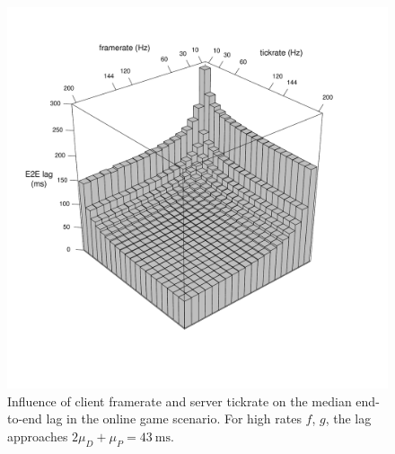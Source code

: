 \begin{figure}[!t]
	\centering
	\vspace{-6mm}
	\includegraphics[width=1.0\columnwidth]{../../../simulation/visualization/e2e-lag-3dbars.pdf}
	\vspace{-15mm}
	\caption{Influence of client framerate and server tickrate on the median end-to-end lag in the online game scenario. For high rates $f$, $g$, the lag approaches $2\mu_D+\mu_P=\SI{43}{\milli\second}$.}
\label{fig:3dbars-framerate-tickrate-lag}
\end{figure}

